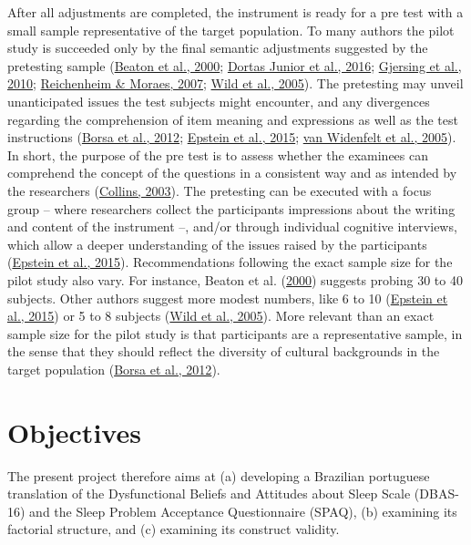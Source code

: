 \documentclass[
  ,doc,11pt, twoside,floatsintext]{apa6}
\begin{document}
After all adjustments are completed, the instrument is ready for a pre test with a small sample representative of the target population. To many authors the pilot study is succeeded only by the final semantic adjustments suggested by the pretesting sample (\protect\hyperlink{ref-beaton2000}{Beaton et al., 2000}; \protect\hyperlink{ref-dortasjunior2016}{Dortas Junior et al., 2016}; \protect\hyperlink{ref-gjersing2010}{Gjersing et al., 2010}; \protect\hyperlink{ref-reichenheim2007}{Reichenheim \& Moraes, 2007}; \protect\hyperlink{ref-wild2005}{Wild et al., 2005}). The pretesting may unveil unanticipated issues the test subjects might encounter, and any divergences regarding the comprehension of item meaning and expressions as well as the test instructions (\protect\hyperlink{ref-borsaAdaptacaoValidacaoInstrumentos2012}{Borsa et al., 2012}; \protect\hyperlink{ref-epstein2015}{Epstein et al., 2015}; \protect\hyperlink{ref-vanwidenfelt2005}{van Widenfelt et al., 2005}). In short, the purpose of the pre test is to assess whether the examinees can comprehend the concept of the questions in a consistent way and as intended by the researchers (\protect\hyperlink{ref-collins2003}{Collins, 2003}). The pretesting can be executed with a focus group -- where researchers collect the participants impressions about the writing and content of the instrument --, and/or through individual cognitive interviews, which allow a deeper understanding of the issues raised by the participants (\protect\hyperlink{ref-epstein2015}{Epstein et al., 2015}). Recommendations following the exact sample size for the pilot study also vary. For instance, Beaton et al. (\protect\hyperlink{ref-beaton2000}{2000}) suggests probing 30 to 40 subjects. Other authors suggest more modest numbers, like 6 to 10 (\protect\hyperlink{ref-epstein2015}{Epstein et al., 2015}) or 5 to 8 subjects (\protect\hyperlink{ref-wild2005}{Wild et al., 2005}). More relevant than an exact sample size for the pilot study is that participants are a representative sample, in the sense that they should reflect the diversity of cultural backgrounds in the target population (\protect\hyperlink{ref-borsaAdaptacaoValidacaoInstrumentos2012}{Borsa et al., 2012}).

\hypertarget{objectives}{%
\section{Objectives}\label{objectives}}

The present project therefore aims at (a) developing a Brazilian portuguese translation of the Dysfunctional Beliefs and Attitudes about Sleep Scale (DBAS-16) and the Sleep Problem Acceptance Questionnaire (SPAQ), (b) examining its factorial structure, and (c) examining its construct validity.
\end{document}
